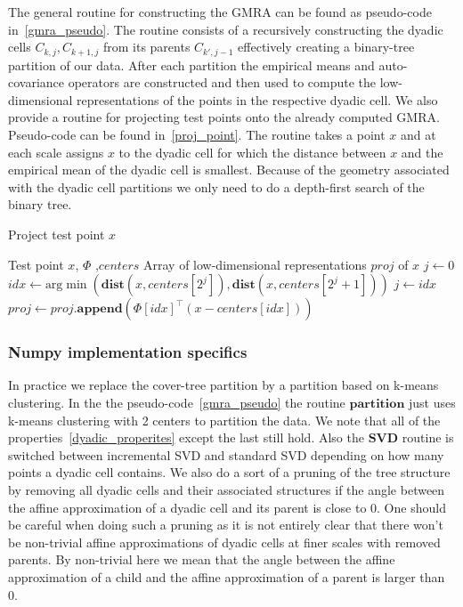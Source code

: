 \documentclass{article}
\begin{document}
	The general routine for constructing the GMRA can be found as pseudo-code in~\ref{gmra_pseudo}. The routine consists of a recursively constructing the dyadic cells $C_{k,j},C_{k+1,j}$ from its parents $C_{k',j-1}$ effectively creating a binary-tree partition of our data. After each partition the empirical means and auto-covariance operators are constructed and then used to compute the low-dimensional representations of the points in the respective dyadic cell. We also provide a routine for projecting test points onto the already computed GMRA. Pseudo-code can be found in~\ref{proj_point}. The routine takes a point $x$ and at each scale assigns $x$ to the dyadic cell for which the distance between $x$ and the empirical mean of the dyadic cell is smallest. Because of the geometry associated with the dyadic cell partitions we only need to do a depth-first search of the binary tree.
	\begin{algorithm}[tbh]
		\caption{Project test point $x$}
		\label{proj_point}
		\begin{algorithmic}
			\REQUIRE Test point $x$, $\Phi$ ,$centers$
			\ENSURE Array of low-dimensional representations $proj$ of $x$
			\STATE $j \leftarrow 0$
			\STATE $idx \leftarrow \text{arg}\min\left(\mathbf{dist}\left(x,centers[2^j]\right),\mathbf{dist}\left(x,centers[2^j+1]\right)\right)$
			\STATE $j \leftarrow idx$
			\STATE $proj \leftarrow proj.\mathbf{append}(\Phi[idx]^{\top}(x-centers[idx]))$
			\ENDWHILE
		\end{algorithmic}
	\end{algorithm}
	\subsubsection{Numpy implementation specifics}
	In practice we replace the cover-tree partition by a partition based on k-means clustering. In the the pseudo-code~\ref{gmra_pseudo} the routine $\mathbf{partition}$ just uses k-means clustering with 2 centers to partition the data. We note that all of the properties~\ref{dyadic_properites} except the last still hold. Also the $\mathbf{SVD}$ routine is switched between incremental SVD and standard SVD depending on how many points a dyadic cell contains. We also do a sort of a pruning of the tree structure by removing all dyadic cells and their associated structures if the angle between the affine approximation of a dyadic cell and its parent is close to 0. One should be careful when doing such a pruning as it is not entirely clear that there won't be non-trivial affine approximations of dyadic cells at finer scales with removed parents. By non-trivial here we mean that the angle between the affine approximation of a child and the affine approximation of a parent is larger than 0.
\end{document}
